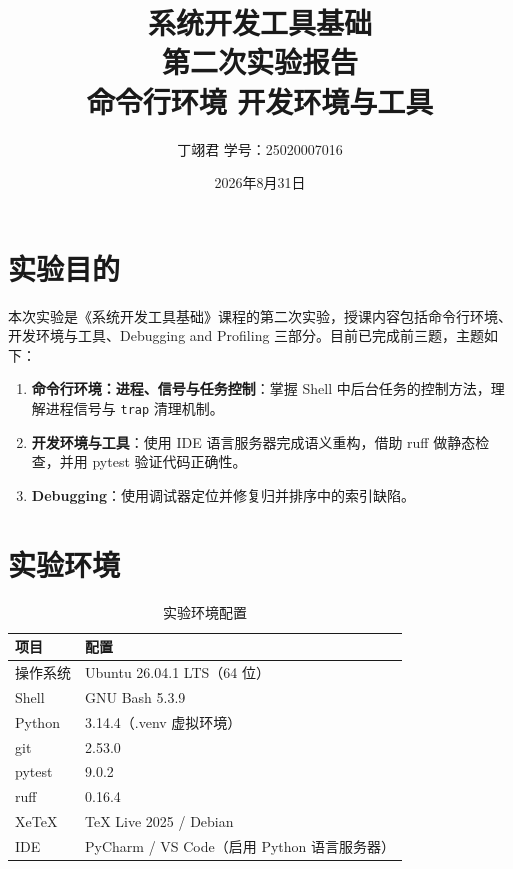 \documentclass[12pt,a4paper]{article}
\title{\vspace{3cm}\Huge\textbf{系统开发工具基础}\\[0.5cm]
\LARGE 第二次实验报告\\[1cm]
\Large 命令行环境 \quad 开发环境与工具}
\author{丁翊君 \quad 学号：25020007016}
\date{2026年8月31日}
\begin{document}
\maketitle
\thispagestyle{empty}
\newpage

\tableofcontents
\newpage

\section{实验目的}

本次实验是《系统开发工具基础》课程的第二次实验，授课内容包括命令行环境、开发环境与工具、Debugging and Profiling 三部分。目前已完成前三题，主题如下：

\begin{enumerate}
    \item \textbf{命令行环境：进程、信号与任务控制}：掌握 Shell 中后台任务的控制方法，理解进程信号与 \texttt{trap} 清理机制。
    \item \textbf{开发环境与工具}：使用 IDE 语言服务器完成语义重构，借助 ruff 做静态检查，并用 pytest 验证代码正确性。
    \item \textbf{Debugging}：使用调试器定位并修复归并排序中的索引缺陷。
\end{enumerate}

\section{实验环境}

\begin{table}[H]
\centering
\caption{实验环境配置}
\begin{tabular}{|l|l|}
\hline
\textbf{项目} & \textbf{配置} \\
\hline
操作系统 & Ubuntu 26.04.1 LTS（64 位） \\
\hline
Shell & GNU Bash 5.3.9 \\
\hline
Python & 3.14.4（.venv 虚拟环境） \\
\hline
git & 2.53.0 \\
\hline
pytest & 9.0.2 \\
\hline
ruff & 0.16.4 \\
\hline
XeTeX & TeX Live 2025 / Debian \\
\hline
IDE & PyCharm / VS Code（启用 Python 语言服务器） \\
\hline
\end{tabular}
\end{table}
\end{document}
